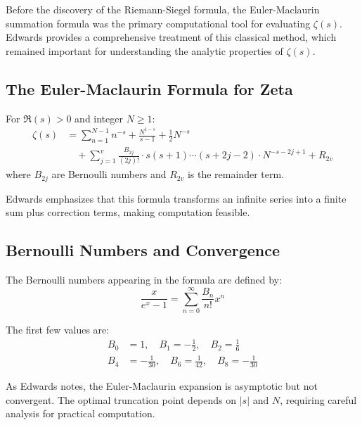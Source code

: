 Before the discovery of the Riemann-Siegel formula, the Euler-Maclaurin summation formula was the primary computational tool for evaluating $\zeta(s)$. Edwards \cite{edwards1974} provides a comprehensive treatment of this classical method, which remained important for understanding the analytic properties of $\zeta(s)$.

\subsection{The Euler-Maclaurin Formula for Zeta}

\begin{theorem}
For $\Re(s) > 0$ and integer $N \geq 1$:
\begin{align}
\zeta(s) &= \sum_{n=1}^{N-1} n^{-s} + \frac{N^{1-s}}{s-1} + \frac{1}{2}N^{-s} \\
&\quad + \sum_{j=1}^{v} \frac{B_{2j}}{(2j)!} \cdot s(s+1)\cdots(s+2j-2) \cdot N^{-s-2j+1} + R_{2v}
\end{align}
where $B_{2j}$ are Bernoulli numbers and $R_{2v}$ is the remainder term.
\end{theorem}

Edwards emphasizes that this formula transforms an infinite series into a finite sum plus correction terms, making computation feasible.

\subsection{Bernoulli Numbers and Convergence}

The Bernoulli numbers appearing in the formula are defined by:
\begin{equation}
\frac{x}{e^x - 1} = \sum_{n=0}^{\infty} \frac{B_n}{n!} x^n
\end{equation}

The first few values are:
\begin{align}
B_0 &= 1, \quad B_1 = -\frac{1}{2}, \quad B_2 = \frac{1}{6} \\
B_4 &= -\frac{1}{30}, \quad B_6 = \frac{1}{42}, \quad B_8 = -\frac{1}{30}
\end{align}

\begin{remark}
As Edwards notes, the Euler-Maclaurin expansion is asymptotic but not convergent. The optimal truncation point depends on $|s|$ and $N$, requiring careful analysis for practical computation.
\end{remark}

